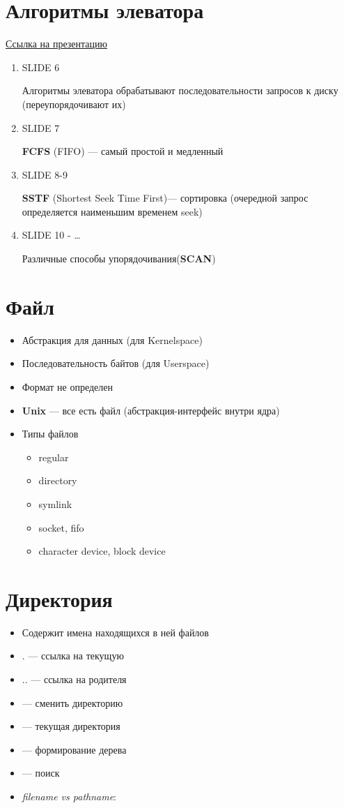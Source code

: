 \documentclass[../../lectures.tex]{subfiles}
\begin{document}
\section{Алгоритмы элеватора}
\textcolor{blue}{\href{https://slideplayer.com/slide/5209336}{Ссылка на презентацию}}
\begin{enumerate}
    \item SLIDE 6
        
          Алгоритмы элеватора обрабатывают последовательности запросов к диску (переупорядочивают их)
    \item SLIDE 7

          \textbf{FCFS} (FIFO) --- самый простой и медленный
    \item SLIDE 8-9

          \textbf{SSTF} (Shortest Seek Time First)--- сортировка (очередной запрос определяется наименьшим временем seek)
    \item SLIDE 10 - \dots

          Различные способы упорядочивания(\textbf{SCAN})
\end{enumerate}

\section{Файл}
\begin{itemize}
    \item Абстракция для данных (для Kernelspace)
    \item Последовательность байтов (для Userspace)
    \item Формат не определен
    \item \textbf{Unix} --- все есть файл (абстракция-интерфейс внутри ядра)
    \item Типы файлов 
          \begin{itemize}
            \item regular
            \item directory
            \item symlink
            \item socket, fifo
            \item character device, block device
          \end{itemize}
\end{itemize}

\section{Директория}
\begin{itemize}
    \item Содержит имена находящихся в ней файлов
    \item $.$ --- ссылка на текущую
    \item $..$ --- ссылка на родителя
    \item {} --- сменить директорию
    \item {} --- текущая директория
    \item {} --- формирование дерева
    \item {} --- поиск
    \item \emph{filename vs pathname}: 
\end{itemize}
\end{document}
